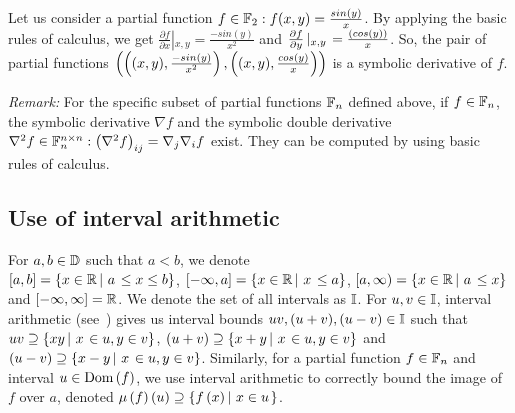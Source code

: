 %
\begin{example}
Let us consider a partial function $f\in\mathbb{F}_{2}: f(x,y) =
\frac{sin\left(y\right)}{x}$.  By applying the basic rules of calculus, we get
$\frac{\partial{f}}{\partial{x}}\left|_{x,y}\right. =
\frac{-sin(y)}{x^2}$ and
$\frac{\partial{f}}{\partial{y}}\left|_{x,y}\right. =
\frac{\left(cos(y)\right)}{x}$. So, the pair of partial functions $\left(
  \left((x,y),\frac{-sin(y)}{x^2}\right), \left((x,y), \frac{{cos(y)}}{x}\right) \right)$
  is a symbolic derivative of $f$.  
\end{example}
%
\emph{Remark:}  For the specific subset of partial functions $\mathbb{F}_{n}$
  defined above,
  if $f\in\mathbb{F}_{n}$, the symbolic derivative $\nabla{f}$ and the
symbolic double derivative $\nabla^2f\in\mathbb{F}_{n}^{n\times
n}: \left(\nabla^2 f\right)_{ij} =
\nabla_j\nabla_i f$ exist.  They can be computed by using
basic rules of calculus.
%
\subsection{Use of interval arithmetic}
For $a,b\in\mathbb{D}$ such that $a<b$, we denote\\ $\left[a,b\right] =
\left\{x\in\mathbb{R}\left|~a\right.\leq x\leq b\right\}$, $[-\infty,a] = \left\{x\in\mathbb{R}\left|~x\right.\leq a\right\}$, $[a,\infty) = \left\{x\in\mathbb{R}\left|~a\right.\leq x\right\}$ and
  $[-\infty,\infty] = \mathbb{R}$.  We denote the set of all intervals as
  $\mathbb{I}$.  For $u,v\in\mathbb{I}$, interval arithmetic
  (see~\cite{bronnimann2006design}) gives us interval bounds
  $uv,(u+v),(u-v)\in\mathbb{I}$ such that $uv\supseteq\left\{xy\left|~x\right.\in
    u, y\in v\right\}$, $\left(u+v\right)\supseteq\left\{x+y\left|~x\right.\in u, y\in v\right\}$ and
  $\left(u-v\right)\supseteq\left\{x-y\left|~x\right.\in u, y\in v\right\}$.  Similarly, for a
  partial function $f\in \mathbb{F}_{n}$ and interval $u\in\operatorname{Dom}\left(f\right)$, we use
  interval arithmetic to correctly bound the image of $f$ over $a$,
  denoted $\mu\left(f\right)\left(u\right) \supseteq \left\{f\left(x\right)\left|~x\in u\right. \right\}$.


